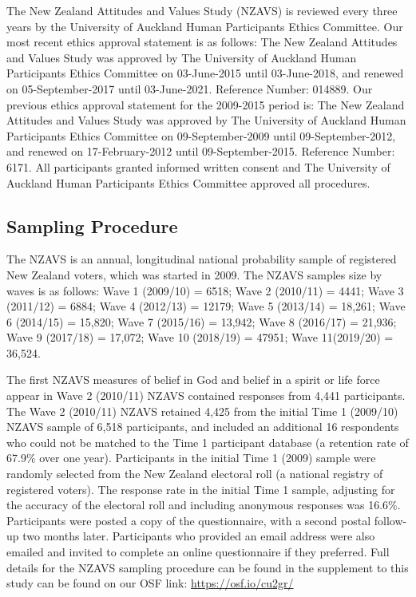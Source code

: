\documentclass[
  english,
  man,floatsintext]{apa6}
\begin{document}
The New Zealand Attitudes and Values Study (NZAVS) is reviewed every three years by the University of Auckland Human Participants Ethics Committee. Our most recent ethics approval statement is as follows: The New Zealand Attitudes and Values Study was approved by The University of Auckland Human Participants Ethics Committee on 03-June-2015 until 03-June-2018, and renewed on 05-September-2017 until 03-June-2021. Reference Number: 014889. Our previous ethics approval statement for the 2009-2015 period is: The New Zealand Attitudes and Values Study was approved by The University of Auckland Human Participants Ethics Committee on 09-September-2009 until 09-September-2012, and renewed on 17-February-2012 until 09-September-2015. Reference Number: 6171. All participants granted informed written consent and The University of Auckland Human Participants Ethics Committee approved all procedures.

\hypertarget{sampling-procedure}{%
\subsection{Sampling Procedure}\label{sampling-procedure}}

The NZAVS is an annual, longitudinal national probability sample of registered New Zealand voters, which was started in 2009. The NZAVS samples size by waves is as follows: Wave 1 (2009/10) = 6518; Wave 2 (2010/11) = 4441; Wave 3 (2011/12) = 6884; Wave 4 (2012/13) = 12179; Wave 5 (2013/14) = 18,261; Wave 6 (2014/15) = 15,820; Wave 7 (2015/16) = 13,942; Wave 8 (2016/17) = 21,936; Wave 9 (2017/18) = 17,072; Wave 10 (2018/19) = 47951; Wave 11(2019/20) = 36,524.

The first NZAVS measures of belief in God and belief in a spirit or life force appear in Wave 2 (2010/11) NZAVS contained responses from 4,441 participants. The Wave 2 (2010/11) NZAVS retained 4,425 from the initial Time 1 (2009/10) NZAVS sample of 6,518 participants, and included an additional 16 respondents who could not be matched to the Time 1 participant database (a retention rate of 67.9\% over one year). Participants in the initial Time 1 (2009) sample were randomly selected from the New Zealand electoral roll (a national registry of registered voters). The response rate in the initial Time 1 sample, adjusting for the accuracy of the electoral roll and including anonymous responses was 16.6\%. Participants were posted a copy of the questionnaire, with a second postal follow-up two months later. Participants who provided an email address were also emailed and invited to complete an online questionnaire if they preferred. Full details for the NZAVS sampling procedure can be found in the supplement to this study can be found on our OSF link: \url{https://osf.io/cu2gr/}
\end{document}
